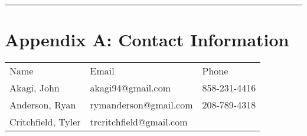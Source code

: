 \documentclass[]{auvsi_doc}
\begin{document}
\begin{center}\rule{0.5\linewidth}{\linethickness}\end{center}



\section{Appendix A: Contact Information}

\begin{longtable}[]{@{}lll@{}}
\toprule
\begin{minipage}[t]{0.30\columnwidth}\raggedright\strut
{Name}\strut
\end{minipage} & \begin{minipage}[t]{0.30\columnwidth}\raggedright\strut
{Email}\strut
\end{minipage} & \begin{minipage}[t]{0.30\columnwidth}\raggedright\strut
{Phone}\strut
\end{minipage}\tabularnewline
\begin{minipage}[t]{0.30\columnwidth}\raggedright\strut
{Akagi, John}\strut
\end{minipage} & \begin{minipage}[t]{0.30\columnwidth}\raggedright\strut
{akagi94@gmail.com}\strut
\end{minipage} & \begin{minipage}[t]{0.30\columnwidth}\raggedright\strut
{858-231-4416}\strut
\end{minipage}\tabularnewline
\begin{minipage}[t]{0.30\columnwidth}\raggedright\strut
{Anderson, Ryan}\strut
\end{minipage} & \begin{minipage}[t]{0.30\columnwidth}\raggedright\strut
{rymanderson@gmail.com}\strut
\end{minipage} & \begin{minipage}[t]{0.30\columnwidth}\raggedright\strut
{208-789-4318}\strut
\end{minipage}\tabularnewline
\begin{minipage}[t]{0.30\columnwidth}\raggedright\strut
{Critchfield, Tyler}\strut
\end{minipage} & \begin{minipage}[t]{0.30\columnwidth}\raggedright\strut
{trcritchfield@gmail.com}\strut
\end{minipage} & \begin{minipage}[t]{0.30\columnwidth}\raggedright\strut

\end{minipage}
\end{longtable}
\end{document}
